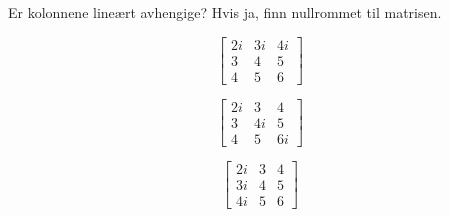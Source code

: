 \begin{oppgave}
Er kolonnene lineært avhengige? Hvis ja, finn nullrommet til matrisen.
\begin{punkt}
\[
\begin{bmatrix}
2i & 3i & 4i \\ 3 & 4 & 5 \\ 4 & 5 & 6 
\end{bmatrix}
\]
\end{punkt}

\begin{punkt}
\[
\begin{bmatrix}
2i & 3 & 4 \\ 3 & 4i & 5 \\ 4 & 5 & 6i 
\end{bmatrix}
\]
\end{punkt}

\begin{punkt}
\[
\begin{bmatrix}
2i & 3 & 4 \\ 3i & 4 & 5 \\ 4i & 5 & 6 
\end{bmatrix}
\]
\end{punkt}
\end{oppgave}

